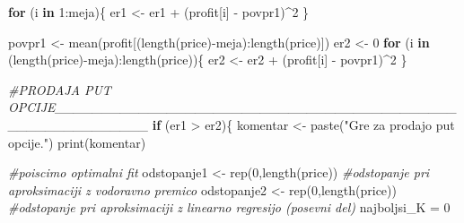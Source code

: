 \documentclass[
]{article}
\newenvironment{Shaded}{\begin{snugshade}}{\end{snugshade}}
\newcommand{\CommentTok}[1]{\textcolor[rgb]{0.56,0.35,0.01}{\textit{#1}}}
\newcommand{\ControlFlowTok}[1]{\textcolor[rgb]{0.13,0.29,0.53}{\textbf{#1}}}
\newcommand{\DecValTok}[1]{\textcolor[rgb]{0.00,0.00,0.81}{#1}}
\newcommand{\FunctionTok}[1]{\textcolor[rgb]{0.00,0.00,0.00}{#1}}
\newcommand{\NormalTok}[1]{#1}
\newcommand{\OtherTok}[1]{\textcolor[rgb]{0.56,0.35,0.01}{#1}}
\newcommand{\SpecialCharTok}[1]{\textcolor[rgb]{0.00,0.00,0.00}{#1}}
\newcommand{\StringTok}[1]{\textcolor[rgb]{0.31,0.60,0.02}{#1}}
\begin{document}
\begin{Shaded}
\begin{Highlighting}[]
    \ControlFlowTok{for}\NormalTok{ (i }\ControlFlowTok{in} \DecValTok{1}\SpecialCharTok{:}\NormalTok{meja)\{}
\NormalTok{      er1 }\OtherTok{\textless{}{-}}\NormalTok{ er1 }\SpecialCharTok{+}\NormalTok{ (profit[i] }\SpecialCharTok{{-}}\NormalTok{ povpr1)}\SpecialCharTok{\^{}}\DecValTok{2}
\NormalTok{    \}}
    
\NormalTok{    povpr1 }\OtherTok{\textless{}{-}} \FunctionTok{mean}\NormalTok{(profit[(}\FunctionTok{length}\NormalTok{(price)}\SpecialCharTok{{-}}\NormalTok{meja)}\SpecialCharTok{:}\FunctionTok{length}\NormalTok{(price)])}
\NormalTok{    er2 }\OtherTok{\textless{}{-}} \DecValTok{0}
    \ControlFlowTok{for}\NormalTok{ (i }\ControlFlowTok{in}\NormalTok{ (}\FunctionTok{length}\NormalTok{(price)}\SpecialCharTok{{-}}\NormalTok{meja)}\SpecialCharTok{:}\FunctionTok{length}\NormalTok{(price))\{}
\NormalTok{      er2 }\OtherTok{\textless{}{-}}\NormalTok{ er2 }\SpecialCharTok{+}\NormalTok{ (profit[i] }\SpecialCharTok{{-}}\NormalTok{ povpr1)}\SpecialCharTok{\^{}}\DecValTok{2}
\NormalTok{    \}}
    
    \CommentTok{\#PRODAJA PUT OPCIJE\_\_\_\_\_\_\_\_\_\_\_\_\_\_\_\_\_\_\_\_\_\_\_\_\_\_\_\_\_\_\_\_\_\_\_\_\_\_\_\_\_\_\_\_\_\_\_\_\_\_\_\_\_\_\_\_\_\_}
    \ControlFlowTok{if}\NormalTok{ (er1 }\SpecialCharTok{\textgreater{}}\NormalTok{ er2)\{}
\NormalTok{      komentar }\OtherTok{\textless{}{-}} \FunctionTok{paste}\NormalTok{(}\StringTok{"Gre za prodajo put opcije."}\NormalTok{)}
      \FunctionTok{print}\NormalTok{(komentar)}
      
      \CommentTok{\#poiscimo optimalni fit}
\NormalTok{      odstopanje1 }\OtherTok{\textless{}{-}} \FunctionTok{rep}\NormalTok{(}\DecValTok{0}\NormalTok{,}\FunctionTok{length}\NormalTok{(price)) }\CommentTok{\#odstopanje pri aproksimaciji z vodoravno premico}
\NormalTok{      odstopanje2 }\OtherTok{\textless{}{-}} \FunctionTok{rep}\NormalTok{(}\DecValTok{0}\NormalTok{,}\FunctionTok{length}\NormalTok{(price)) }\CommentTok{\#odstopanje pri aproksimaciji z linearno regresijo (posevni del)}
\NormalTok{      najboljsi\_K }\OtherTok{=} \DecValTok{0}
      

\end{Highlighting}
\end{Shaded}
\end{document}
